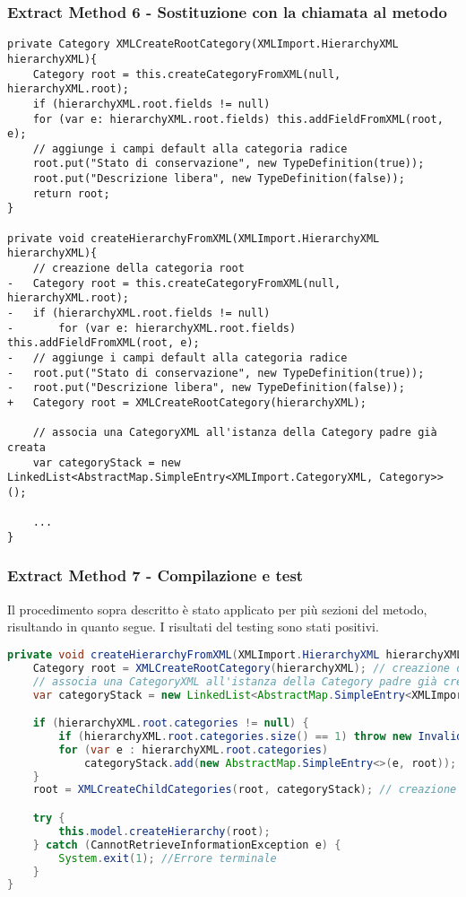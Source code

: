 \begin{frame}[fragile]
    \frametitle{Extract Method 6 - Sostituzione con la chiamata al metodo}
    \begin{lstlisting}[language=tiny_diff]
private Category XMLCreateRootCategory(XMLImport.HierarchyXML hierarchyXML){
    Category root = this.createCategoryFromXML(null, hierarchyXML.root);
    if (hierarchyXML.root.fields != null)
    for (var e: hierarchyXML.root.fields) this.addFieldFromXML(root, e);
    // aggiunge i campi default alla categoria radice
    root.put("Stato di conservazione", new TypeDefinition(true));
    root.put("Descrizione libera", new TypeDefinition(false));
    return root;
}

private void createHierarchyFromXML(XMLImport.HierarchyXML hierarchyXML){
    // creazione della categoria root
-   Category root = this.createCategoryFromXML(null, hierarchyXML.root);
-   if (hierarchyXML.root.fields != null)
-       for (var e: hierarchyXML.root.fields) this.addFieldFromXML(root, e);
-   // aggiunge i campi default alla categoria radice
-   root.put("Stato di conservazione", new TypeDefinition(true));
-   root.put("Descrizione libera", new TypeDefinition(false));
+   Category root = XMLCreateRootCategory(hierarchyXML);

    // associa una CategoryXML all'istanza della Category padre già creata
    var categoryStack = new LinkedList<AbstractMap.SimpleEntry<XMLImport.CategoryXML, Category>>();

    ...
}
\end{lstlisting}
\end{frame}

\begin{frame}[fragile]
    \frametitle{Extract Method 7 - Compilazione e test}
    Il procedimento sopra descritto è stato applicato per più sezioni del metodo, risultando in quanto segue. I risultati del testing sono stati positivi.
\lstset{style=tiny_java}
\begin{lstlisting}[language=java, caption={Refactor del metodo Controller\#createHierarchyFromXML()}]
private void createHierarchyFromXML(XMLImport.HierarchyXML hierarchyXML){
    Category root = XMLCreateRootCategory(hierarchyXML); // creazione della categoria root
    // associa una CategoryXML all'istanza della Category padre già creata
    var categoryStack = new LinkedList<AbstractMap.SimpleEntry<XMLImport.CategoryXML, Category>>();

    if (hierarchyXML.root.categories != null) {
        if (hierarchyXML.root.categories.size() == 1) throw new InvalidCategoryException();
        for (var e : hierarchyXML.root.categories)
            categoryStack.add(new AbstractMap.SimpleEntry<>(e, root));
    }
    root = XMLCreateChildCategories(root, categoryStack); // creazione delle categorie figlie

    try {
        this.model.createHierarchy(root);
    } catch (CannotRetrieveInformationException e) {
        System.exit(1); //Errore terminale
    }
}
\end{lstlisting}
\end{frame}